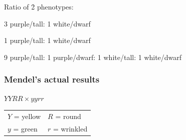 {\begin{noheadline}
\begin{frame}[t]
    Ratio of \f{2} phenotypes:
    \begin{clickeroptions}
        \item 3 purple/tall: 1 white/dwarf
        \item 1 purple/tall: 1 white/dwarf
        \item 9 purple/tall: 1 purple/dwarf: 1 white/tall: 1 white/dwarf
        \item {}
    \end{clickeroptions}
\end{frame}
\end{noheadline}
}

\begin{frame}[t]
    \frametitle{Mendel's actual results}
    \vspace{-6mm}
    \begin{center}
        $YYRR  \times yyrr$
    \end{center}
    \vspace{-4mm}
    \begin{table}%
        \centering
        \begin{tabular}{l l}
            $Y$ = yellow & $R$ = round \\
            $y$ = green & $r$ = wrinkled \\
        \end{tabular}
    \end{table}

    \vspace{-2mm}

    \vspace{2mm}


\end{frame}

